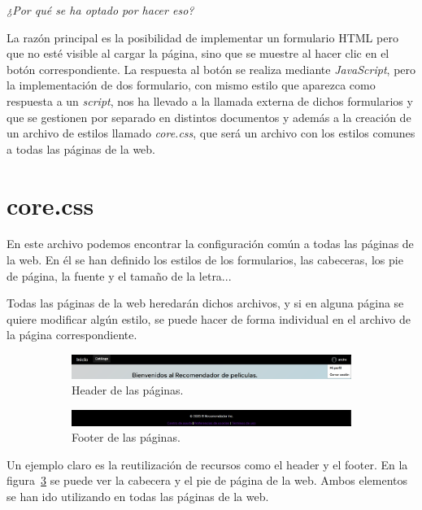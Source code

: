 \documentclass[a4paper, 12pt]{report}
\begin{document}
    \textit{¿Por qué se ha optado por hacer eso?}

    La razón principal es la posibilidad de implementar un formulario HTML pero que no esté visible al cargar la página, sino que se muestre al hacer clic en el botón correspondiente. La respuesta al botón se realiza mediante \textit{JavaScript}, pero la implementación de dos formulario, con mismo estilo que aparezca como respuesta a un \textit{script}, nos ha llevado a la llamada externa de dichos formularios y que se gestionen por separado en distintos documentos y además a la creación de un archivo de estilos llamado \textit{core.css}, que será un archivo con los estilos comunes a todas las páginas de la web.
    \section{core.css}
    En este archivo podemos encontrar la configuración común a todas las páginas de la web. En él se han definido los estilos de los formularios, las cabeceras, los pie de página, la fuente y el tamaño de la letra...

    Todas las páginas de la web heredarán dichos archivos, y si en alguna página se quiere modificar algún estilo, se puede hacer de forma individual en el archivo de la página correspondiente.

    \begin{figure}[h!]
        \centering
        \begin{subfigure}{0.45\textwidth}
            \includegraphics[width=\textwidth]{resources/img/header.png}
            \caption{Header de las páginas.}
            \label{fig:header}
        \end{subfigure}
        \hfill
        \begin{subfigure}{0.45\textwidth}
            \includegraphics[width=\textwidth]{resources/img/footer.png}
            \caption{Footer de las páginas.}
            \label{fig:footer}
        \end{subfigure}
        \caption{}
        \label{fig:elementoscompartidos}
    \end{figure}

    Un ejemplo claro es la reutilización de recursos como el header y el footer. En la figura~\ref{fig:elementoscompartidos} se puede ver la cabecera y el pie de página de la web. Ambos elementos se han ido utilizando en todas las páginas de la web.
\end{document}
